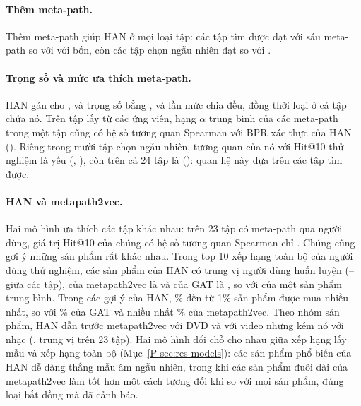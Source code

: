 \paragraph{Thêm meta-path.} Thêm meta-path giúp HAN ở mọi loại tập: các tập tìm được đạt
 với sáu meta-path so với  với bốn, còn các
tập chọn ngẫu nhiên đạt  so với .

\paragraph{Trọng số và mức ưa thích meta-path.} HAN gán cho ,  và
 trọng số bằng ,  và  lần mức chia
đều, đồng thời loại  ở cả  tập chứa nó. Trên  tập lấy từ các
ứng viên, hạng $\alpha$ trung bình của các meta-path trong một tập cũng có hệ số tương quan Spearman
 với BPR xác thực của HAN (). Riêng trong mười tập chọn
ngẫu nhiên, tương quan của nó với Hit@10 thử nghiệm là yếu (,
), còn trên cả 24 tập là  (): quan hệ này dựa
trên các tập tìm được.

\paragraph{HAN và metapath2vec.} Hai mô hình ưa thích các tập khác nhau: trên 23 tập có meta-path
qua người dùng, giá trị Hit@10 của chúng có hệ số tương quan Spearman chỉ . Chúng
cũng gợi ý những sản phẩm rất khác nhau. Trong top 10 xếp hạng toàn bộ của  người dùng
thử nghiệm, các sản phẩm của HAN có trung vị  người dùng huấn luyện
(-- giữa các tập), của metapath2vec là 
và của GAT là , so với  của một sản phẩm trung bình. Trong các gợi ý
của HAN, \% đến từ 1\% sản phẩm được mua nhiều nhất, so với
\% của GAT và nhiều nhất \% của metapath2vec. Theo nhóm sản phẩm, HAN
dẫn trước metapath2vec  với DVD và  với video nhưng kém nó
với nhạc (, trung vị trên 23 tập). Hai mô hình đổi chỗ cho nhau giữa xếp hạng
lấy mẫu và xếp hạng toàn bộ (Mục~\ref*{P-sec:res-models}): các sản phẩm phổ biến của HAN dễ dàng thắng
 mẫu âm ngẫu nhiên, trong khi các sản phẩm đuôi dài của metapath2vec làm tốt
hơn một cách tương đối khi so với mọi sản phẩm, đúng loại bất đồng mà \citet{krichene2022sampled}
đã cảnh báo.

